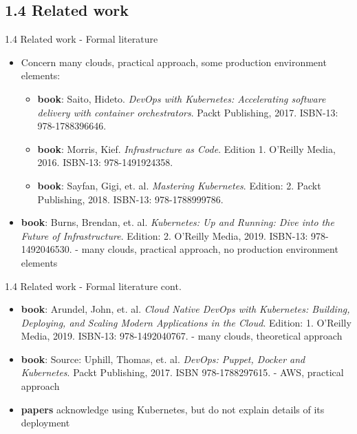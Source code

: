 \documentclass{beamer}
\begin{document}
\subsection{1.4 Related work}
\begin{frame}{1.4 Related work - Formal literature}%
\begin{itemize}
	\item Concern many clouds, practical approach, some production environment elements:
	\begin{itemize}
		\item \textbf{book}: Saito, Hideto. \textit{DevOps with Kubernetes: Accelerating software delivery with container orchestrators}. Packt Publishing, 2017. ISBN-13: 978-1788396646.
		\item \textbf{book}: Morris, Kief. \textit{Infrastructure as Code}. Edition 1. O'Reilly Media, 2016. ISBN-13: 978-1491924358.
		\item \textbf{book}: Sayfan, Gigi, et. al. \textit{Mastering Kubernetes}. Edition: 2.  Packt Publishing, 2018. ISBN-13: 978-1788999786.
	\end{itemize}
	\item \textbf{book}: Burns, Brendan, et. al. \textit{Kubernetes: Up and Running: Dive into the Future of Infrastructure}. Edition: 2. O'Reilly Media, 2019. ISBN-13: 978-1492046530. - many clouds, practical approach, no production environment elements
\end{itemize}
\end{frame}
\begin{frame}{1.4 Related work - Formal literature cont.}%
	\begin{itemize}
		\item \textbf{book}: Arundel, John, et. al. \textit{Cloud Native DevOps with Kubernetes: Building, Deploying, and Scaling Modern Applications in the Cloud}. Edition: 1. O'Reilly Media, 2019. ISBN-13: 978-1492040767. - many clouds, theoretical approach
		\item \textbf{book}: Source: Uphill, Thomas, et. al. \textit{DevOps: Puppet, Docker and Kubernetes}. Packt Publishing, 2017. ISBN 978-1788297615. - AWS, practical approach
		\item \textbf{papers} acknowledge using Kubernetes, but do not explain details of its deployment
	\end{itemize}
	\end{frame}
\end{document}
